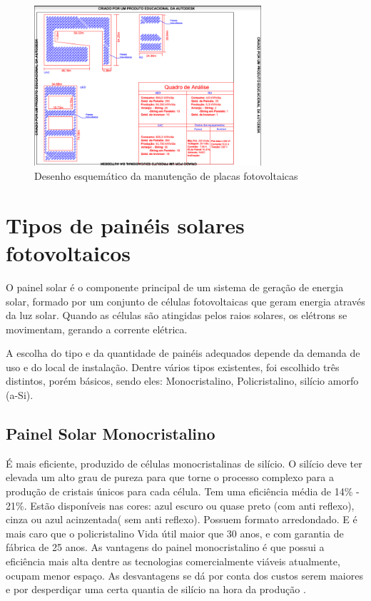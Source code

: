 \begin{figure}[!h]
\centering
\includegraphics[width=0.75\textwidth]{figuras/fotovoltaica.png}
\caption{Desenho esquemático da manutenção de placas fotovoltaicas}
\label{fig:fotovoltaica}
\end{figure}

\section{Tipos de painéis solares fotovoltaicos}

O painel solar é o componente principal de um sistema de geração de energia solar, formado por um conjunto de células fotovoltaicas que geram energia através da luz solar. Quando  as células são atingidas pelos raios solares, os elétrons se movimentam, gerando a corrente elétrica.

A escolha do tipo e da quantidade de painéis adequados depende da demanda de uso e do local de instalação. Dentre vários tipos existentes, foi escolhido três distintos, porém básicos, sendo eles: Monocristalino, Policristalino, silício amorfo (a-Si).

\subsection{Painel Solar Monocristalino}

É mais eficiente, produzido de células monocristalinas de silício. O silício deve ter elevada um alto grau de pureza para que torne o processo complexo para a produção de cristais únicos para cada célula. Tem uma eficiência média de 14\% - 21\%. Estão disponíveis nas cores: azul escuro ou quase preto (com anti reflexo), cinza ou azul acinzentada( sem anti reflexo). Possuem formato arredondado. E é mais caro que o policristalino Vida útil maior que 30 anos, e com garantia de fábrica de 25 anos. As vantagens do painel monocristalino é  que possui a eficiência mais alta dentre as tecnologias comercialmente viáveis atualmente, ocupam menor espaço. As desvantagens se dá por conta dos custos serem maiores e por desperdiçar uma certa quantia de silício na hora da produção \cite{neosolar}.

